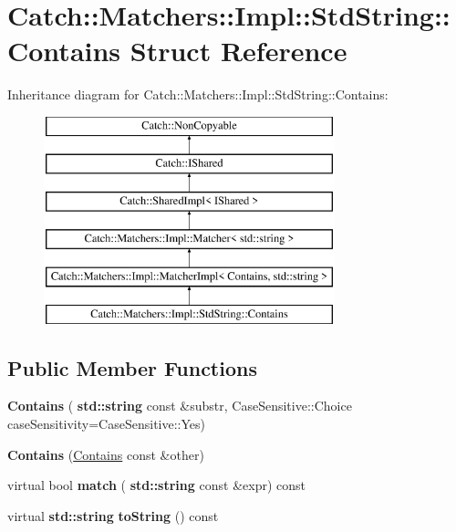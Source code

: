 \hypertarget{struct_catch_1_1_matchers_1_1_impl_1_1_std_string_1_1_contains}{}\section{Catch\+:\+:Matchers\+:\+:Impl\+:\+:Std\+String\+:\+:Contains Struct Reference}
\label{struct_catch_1_1_matchers_1_1_impl_1_1_std_string_1_1_contains}
Inheritance diagram for Catch\+:\+:Matchers\+:\+:Impl\+:\+:Std\+String\+:\+:Contains\+:\begin{figure}[H]
\begin{center}
\leavevmode
\includegraphics[height=6.000000cm]{struct_catch_1_1_matchers_1_1_impl_1_1_std_string_1_1_contains}
\end{center}
\end{figure}
\subsection*{Public Member Functions}
\begin{DoxyCompactItemize}
\item 
\mbox{\label{struct_catch_1_1_matchers_1_1_impl_1_1_std_string_1_1_contains_a7a062d83bd3e3075929dbb55e1c24258}} 
{\bfseries Contains} (\textbf{ std\+::string} const \&substr, Case\+Sensitive\+::\+Choice case\+Sensitivity=Case\+Sensitive\+::\+Yes)
\item 
\mbox{\label{struct_catch_1_1_matchers_1_1_impl_1_1_std_string_1_1_contains_ad6b1ef653dfcb3bab43c43be043dc4e8}} 
{\bfseries Contains} (\hyperlink{struct_catch_1_1_matchers_1_1_impl_1_1_std_string_1_1_contains}{Contains} const \&other)
\item 
\mbox{\label{struct_catch_1_1_matchers_1_1_impl_1_1_std_string_1_1_contains_a2248f3d0d1eb5cf5a1059c183b811a7c}} 
virtual bool {\bfseries match} (\textbf{ std\+::string} const \&expr) const
\item 
\mbox{\label{struct_catch_1_1_matchers_1_1_impl_1_1_std_string_1_1_contains_aed168ddff5bce9295aec5c7daca89849}} 
virtual \textbf{ std\+::string} {\bfseries to\+String} () const
\end{DoxyCompactItemize}
